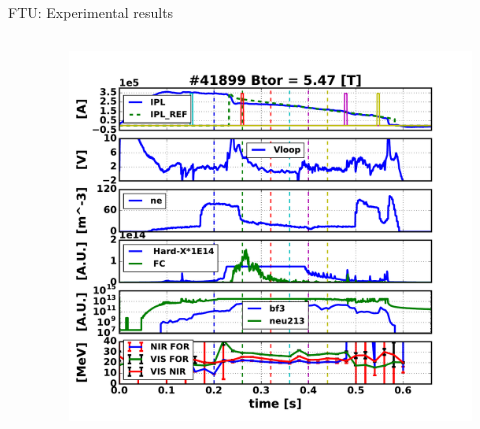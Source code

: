 \documentclass{beamer}
\begin{document}
\begin{frame}{FTU: Experimental results}
{\begin{columns}
\begin{column}{0.5\textwidth}
        \end{column}
        
        \begin{column}{0.5\textwidth}  %
        
        \begin{figure}
            \vspace*{-1cm}
        	\begin{center}
                  \includegraphics[width=1\textwidth]{chapterreisfig/ftu/41899_ipl_.pdf}
        	\end{center}
        \end{figure}

        \end{column}
        \end{columns}    
    
    }
    
    
\end{frame}
\end{document}
